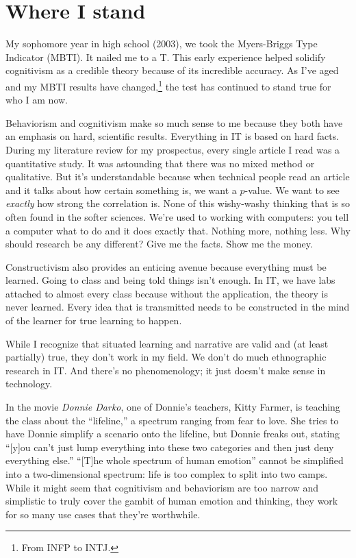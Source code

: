 \documentclass[man,natbib]{apa6}
\begin{document}
\section{Where I stand}
My sophomore year in high school (2003), we took the Myers-Briggs Type Indicator (MBTI). It nailed me to a T. This early experience helped solidify cognitivism as a credible theory because of its incredible accuracy. As I've aged and my MBTI results have changed,\footnote{From INFP to INTJ.} the test has continued to stand true for who I am now.

Behaviorism and cognitivism make so much sense to me because they both have an emphasis on hard, scientific results. Everything in IT is based on hard facts. During my literature review for my prospectus, every single article I read was a quantitative study. It was astounding that there was no mixed method or qualitative. But it's understandable because when technical people read an article and it talks about how certain something is, we want a $p$-value. We want to see \emph{exactly} how strong the correlation is. None of this wishy-washy thinking that is so often found in the softer sciences. We're used to working with computers: you tell a computer what to do and it does exactly that. Nothing more, nothing less. Why should research be any different? Give me the facts. Show me the money.

Constructivism also provides an enticing avenue because everything must be learned. Going to class and being told things isn't enough. In IT, we have labs attached to almost every class because without the application, the theory is never learned. Every idea that is transmitted needs to be constructed in the mind of the learner for true learning to happen.

While I recognize that situated learning and narrative are valid and (at least partially) true, they don't work in my field. We don't do much ethnographic research in IT. And there's no phenomenology; it just doesn't make sense in technology.

In the movie \textit{Donnie Darko}, one of Donnie's teachers, Kitty Farmer, is teaching the class about the ``lifeline,'' a spectrum ranging from fear to love. She tries to have Donnie simplify a scenario onto the lifeline, but Donnie freaks out, stating ``[y]ou can't just lump everything into these two categories and then just deny everything else.'' ``[T]he whole spectrum of human emotion'' cannot be simplified into a two-dimensional spectrum: life is too complex to split into two camps. While it might seem that cognitivism and behaviorism are too narrow and simplistic to truly cover the gambit of human emotion and thinking, they work for so many use cases that they're worthwhile.
\end{document}
